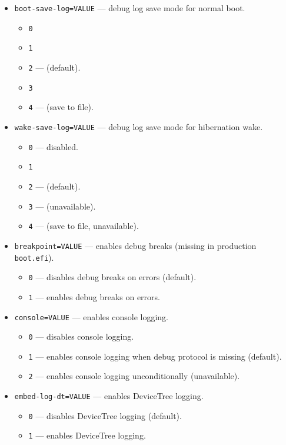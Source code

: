 \documentclass[]{article}
\begin{document}
\begin{itemize}
  \begin{itemize}
  \item \texttt{boot-save-log=VALUE} --- debug log save mode for normal boot.
  	\begin{itemize}
    \item \texttt{0}
    \item \texttt{1}
    \item \texttt{2} --- (default).
    \item \texttt{3}
    \item \texttt{4} --- (save to file).
    \end{itemize}
  \item \texttt{wake-save-log=VALUE} --- debug log save mode for hibernation wake.
  	\begin{itemize}
    \item \texttt{0} --- disabled.
    \item \texttt{1}
    \item \texttt{2} --- (default).
    \item \texttt{3} --- (unavailable).
    \item \texttt{4} --- (save to file, unavailable).
    \end{itemize}
  \item \texttt{breakpoint=VALUE} --- enables debug breaks (missing in production \texttt{boot.efi}).
    \begin{itemize}
    \item \texttt{0} --- disables debug breaks on errors (default).
    \item \texttt{1} --- enables debug breaks on errors.
    \end{itemize}
  \item \texttt{console=VALUE} --- enables console logging.
    \begin{itemize}
    \item \texttt{0} --- disables console logging.
    \item \texttt{1} --- enables console logging when debug protocol is missing (default).
    \item \texttt{2} --- enables console logging unconditionally (unavailable).
    \end{itemize}
  \item \texttt{embed-log-dt=VALUE} --- enables DeviceTree logging.
    \begin{itemize}
    \item \texttt{0} --- disables DeviceTree logging (default).
    \item \texttt{1} --- enables DeviceTree logging.

\end{itemize}
\end{itemize}
\end{itemize}
\end{document}
